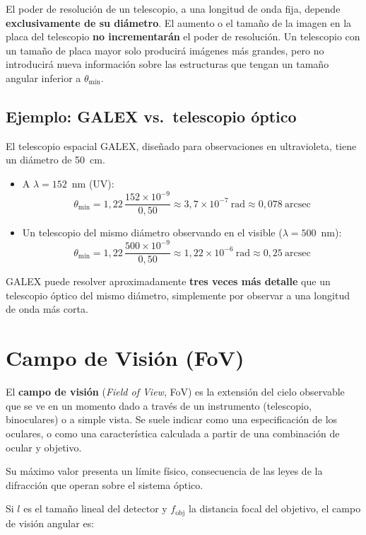 El poder de resolución de un telescopio, a una longitud de onda fija, depende \textbf{exclusivamente de su diámetro}. El aumento o el tamaño de la imagen en la placa del telescopio \textbf{no incrementarán} el poder de resolución. Un telescopio con un tamaño de placa mayor solo producirá imágenes más grandes, pero no introducirá nueva información sobre las estructuras que tengan un tamaño angular inferior a $\theta_{\text{mín}}$.

\subsection{Ejemplo: GALEX vs.\ telescopio óptico}

El telescopio espacial GALEX, diseñado para observaciones en ultravioleta, tiene un diámetro de 50~cm.

\begin{itemize}
    \item A $\lambda = 152$~nm (UV):
$$\theta_{\text{mín}} = 1{,}22\,\frac{152\times10^{-9}}{0{,}50} \approx 3{,}7\times10^{-7}~\text{rad} \approx 0{,}078~\text{arcsec}$$
    \item Un telescopio del mismo diámetro observando en el visible ($\lambda = 500$~nm):
$$\theta_{\text{mín}} = 1{,}22\,\frac{500\times10^{-9}}{0{,}50} \approx 1{,}22\times10^{-6}~\text{rad} \approx 0{,}25~\text{arcsec}$$
\end{itemize}

GALEX puede resolver aproximadamente \textbf{tres veces más detalle} que un telescopio óptico del mismo diámetro, simplemente por observar a una longitud de onda más corta.

\section{Campo de Visión (FoV)}

El \textbf{campo de visión} (\textit{Field of View}, FoV) es la extensión del cielo observable que se ve en un momento dado a través de un instrumento (telescopio, binoculares) o a simple vista. Se suele indicar como una especificación de los oculares, o como una característica calculada a partir de una combinación de ocular y objetivo.

Su máximo valor presenta un límite físico, consecuencia de las leyes de la difracción que operan sobre el sistema óptico.

Si $l$ es el tamaño lineal del detector y $f_{\text{obj}}$ la distancia focal del objetivo, el campo de visión angular es:

